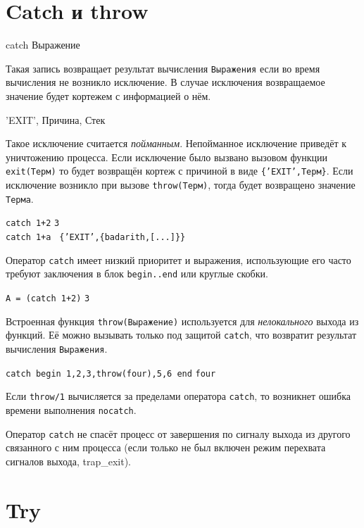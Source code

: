 \section{Catch и throw}
\label{errorhandling:catchthrow}
\begin{erlangru}
catch Выражение
\end{erlangru}

Такая запись возвращает результат вычисления \texttt{Выражения} если во время 
вычисления не возникло исключение. В случае исключения возвращаемое значение 
будет кортежем с информацией о нём.

\begin{erlangru}
{'EXIT', {Причина, Стек}}
\end{erlangru}

Такое исключение считается \emph{пойманным}. Непойманное исключение приведёт к 
уничтожению процесса. Если исключение было вызвано вызовом функции 
\texttt{exit(Терм)} то будет возвращён кортеж с причиной в виде 
\texttt{\{'EXIT',Терм\}}. Если исключение возникло при вызове 
\texttt{throw(Терм)}, тогда будет возвращено значение \texttt{Терма}.

\texttt{catch 1+2} \resultingin \texttt{3}\\
\texttt{catch 1+a } \resultingin \texttt{\{'EXIT',\{badarith,[...]\}\}}

Оператор \texttt{catch} имеет низкий приоритет и выражения, использующие его 
часто требуют заключения в блок \texttt{begin..end} или круглые скобки.

\texttt{A = (catch 1+2)} \resultingin \texttt{3}

Встроенная функция \texttt{throw(Выражение)} используется для 
\emph{нелокального} выхода из функций. Её можно вызывать только под защитой
\texttt{catch}, что возвратит результат вычисления \texttt{Выражения}.

\texttt{catch begin 1,2,3,throw(four),5,6 end} \resultingin \texttt{four}

Если \texttt{throw/1} вычисляется за пределами оператора \texttt{catch}, то 
возникнет ошибка времени выполнения \texttt{nocatch}.

Оператор \texttt{catch} не спасёт процесс от завершения по сигналу выхода из 
другого связанного с ним процесса (если только не был включен режим перехвата 
сигналов выхода, trap\_exit).


\section{Try}
\label{errorhandling:try}

